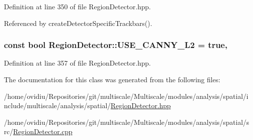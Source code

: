 Definition at line 350 of file Region\-Detector.\-hpp.



Referenced by create\-Detector\-Specific\-Trackbars().

\hypertarget{classmultiscale_1_1analysis_1_1RegionDetector_a6a8c4f7b9a6bc40ec6de940f53943772}{
\subsubsection[{U\-S\-E\-\_\-\-C\-A\-N\-N\-Y\-\_\-\-L2}]{\setlength{\rightskip}{0pt plus 5cm}const bool Region\-Detector\-::\-U\-S\-E\-\_\-\-C\-A\-N\-N\-Y\-\_\-\-L2 = true\hspace{0.3cm}{\ttfamily [static]}, {\ttfamily [private]}}}\label{classmultiscale_1_1analysis_1_1RegionDetector_a6a8c4f7b9a6bc40ec6de940f53943772}


Definition at line 357 of file Region\-Detector.\-hpp.



The documentation for this class was generated from the following files\-:\begin{DoxyCompactItemize}
\item 
/home/ovidiu/\-Repositories/git/multiscale/\-Multiscale/modules/analysis/spatial/include/multiscale/analysis/spatial/\hyperlink{RegionDetector_8hpp}{Region\-Detector.\-hpp}\item 
/home/ovidiu/\-Repositories/git/multiscale/\-Multiscale/modules/analysis/spatial/src/\hyperlink{RegionDetector_8cpp}{Region\-Detector.\-cpp}\end{DoxyCompactItemize}
